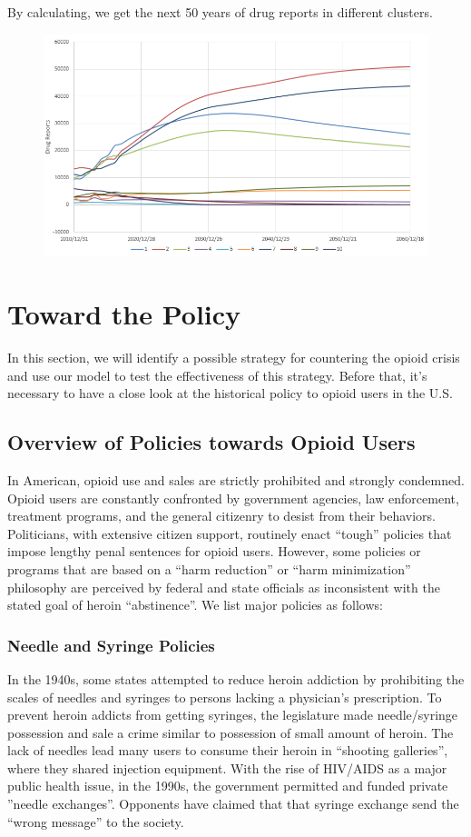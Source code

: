 \documentclass[12pt]{article}
\begin{document}
By calculating, we get the next 50 years of drug reports in different clusters. 
\begin{figure}[H]
	\centering
	\includegraphics[scale=0.7]{./figures/12.png}
	\caption{}
	\label{Fig12}
\end{figure}

\section{Toward the Policy}
In this section, we will identify a possible strategy for countering the opioid crisis and use our model to test the effectiveness of this strategy. Before that, it’s necessary to have a close look at the historical policy to opioid users in the U.S.

\subsection{Overview of Policies towards Opioid Users} %
In American, opioid use and sales are strictly prohibited and strongly condemned. Opioid users are constantly confronted by government agencies, law enforcement, treatment programs, and the general citizenry to desist from their behaviors. Politicians, with extensive citizen support, routinely enact “tough” policies that impose lengthy penal sentences for opioid users. However, some policies or programs that are based on a “harm reduction” or “harm minimization” philosophy are perceived by federal and state officials as inconsistent with the stated goal of heroin “abstinence”. We list major policies as follows:

\subsubsection{Needle and Syringe Policies}
In the 1940s, some states attempted to reduce heroin addiction by prohibiting the scales of needles and syringes to persons lacking a physician’s prescription. To prevent heroin addicts from getting syringes, the legislature made needle/syringe possession and sale a crime similar to possession of small amount of heroin. The lack of needles lead  many users to consume their heroin in “shooting galleries”, where they shared injection equipment. With the rise of HIV/AIDS as a major public health issue, in the 1990s, the government permitted and funded private ”needle exchanges”. Opponents have claimed that that syringe exchange send the “wrong message” to the society.
\end{document}
